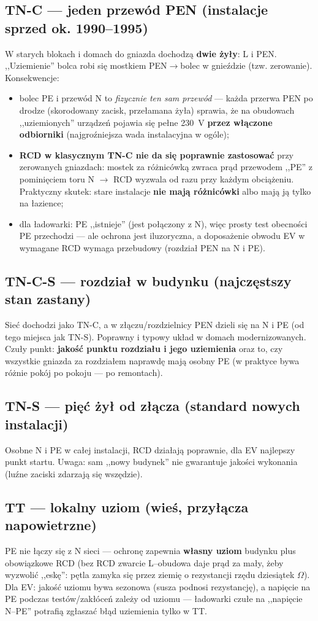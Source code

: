 \documentclass[11pt,a4paper]{article}
\newcommand{\ohm}{$\Omega$}
\begin{document}
\subsection{TN-C --- jeden przewód PEN (instalacje sprzed ok. 1990--1995)}
W starych blokach i domach do gniazda dochodzą \textbf{dwie żyły}: L i PEN. ,,Uziemienie'' bolca
robi się mostkiem PEN$\to$bolec w gnieździe (tzw. zerowanie). Konsekwencje:
\begin{itemize}
\item bolec PE i przewód N to \emph{fizycznie ten sam przewód} --- każda przerwa PEN po drodze
(skorodowany zacisk, przełamana żyła) sprawia, że na obudowach ,,uziemionych'' urządzeń pojawia się
pełne 230~V \textbf{przez włączone odbiorniki} (najgroźniejsza wada instalacyjna w ogóle);
\item \textbf{RCD w klasycznym TN-C nie da się poprawnie zastosować} przy zerowanych gniazdach:
mostek za różnicówką zwraca prąd przewodem ,,PE'' z pominięciem toru N $\to$ RCD wyzwala od razu
przy każdym obciążeniu. Praktyczny skutek: stare instalacje \textbf{nie mają różnicówki} albo mają
ją tylko na łazience;
\item dla ładowarki: PE ,,istnieje'' (jest połączony z N), więc prosty test obecności PE przechodzi
--- ale ochrona jest iluzoryczna, a doposażenie obwodu EV w wymagane RCD wymaga przebudowy
(rozdział PEN na N i PE).
\end{itemize}
\subsection{TN-C-S --- rozdział w budynku (najczęstszy stan zastany)}
Sieć dochodzi jako TN-C, a w złączu/rozdzielnicy PEN dzieli się na N i PE (od tego miejsca jak
TN-S). Poprawny i typowy układ w domach modernizowanych. Czuły punkt: \textbf{jakość punktu
rozdziału i jego uziemienia} oraz to, czy wszystkie gniazda za rozdziałem naprawdę mają osobny PE
(w praktyce bywa różnie pokój po pokoju --- po remontach).
\subsection{TN-S --- pięć żył od złącza (standard nowych instalacji)}
Osobne N i PE w całej instalacji, RCD działają poprawnie, dla EV najlepszy punkt startu. Uwaga:
sam ,,nowy budynek'' nie gwarantuje jakości wykonania (luźne zaciski zdarzają się wszędzie).
\subsection{TT --- lokalny uziom (wieś, przyłącza napowietrzne)}
PE nie łączy się z N sieci --- ochronę zapewnia \textbf{własny uziom} budynku plus obowiązkowe RCD
(bez RCD zwarcie L--obudowa daje prąd za mały, żeby wyzwolić ,,eskę'': pętla zamyka się przez
ziemię o rezystancji rzędu dziesiątek \ohm). Dla EV: jakość uziomu bywa sezonowa (susza podnosi
rezystancję), a napięcie na PE podczas testów/zakłóceń zależy od uziomu --- ładowarki czułe na
,,napięcie N--PE'' potrafią zgłaszać błąd uziemienia tylko w TT.
\end{document}
